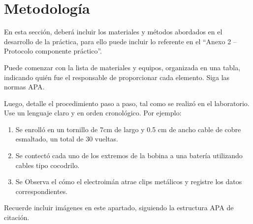 \section{Metodología}

En esta sección, deberá incluir los materiales y métodos abordados en el desarrollo de
la práctica, para ello puede incluir lo referente en el ``Anexo 2 – Protocolo componente
práctico''.

Puede comenzar con la lista de materiales y equipos, organizada en una tabla, indicando 
quién fue el responsable de proporcionar cada elemento. Siga las normas APA.

Luego, detalle el procedimiento paso a paso, tal como se realizó en el laboratorio. Use
un lenguaje claro y en orden cronológico. Por ejemplo:

\begin{enumerate}
	\item Se enrolló en un tornillo de 7cm de largo y 0.5 cm de ancho cable de cobre esmaltado, un total de 30 vueltas.
	\item Se contectó cada uno de los extremos de la bobina a una batería utilizando cables tipo cocodrilo.
	\item Se Observa el cómo el electroimán atrae clips metálicos y registre los datos correspondientes.
\end{enumerate}

Recuerde incluir imágenes en este apartado, siguiendo la estructura APA de citación.
